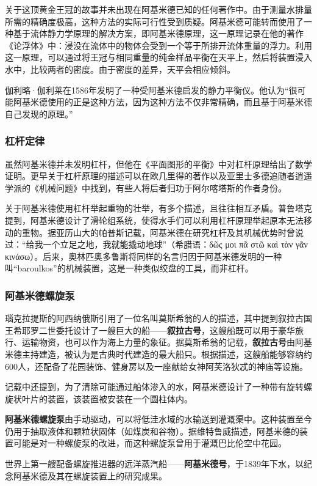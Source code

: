 关于这顶黄金王冠的故事并未出现在阿基米德已知的任何著作中。由于测量水排量所需的精确度极高，这种方法的实际可行性受到质疑。阿基米德可能转而使用了一种基于流体静力学原理的解决方案，即阿基米德原理，这一原理记录在他的著作《论浮体》中：浸没在流体中的物体会受到一个等于所排开流体重量的浮力。利用这一原理，可以通过将王冠与相同重量的纯金样品平衡在天平上，然后将装置浸入水中，比较两者的密度。由于密度的差异，天平会相应倾斜。

伽利略·伽利莱在1586年发明了一种受阿基米德启发的静力平衡仪。他认为“很可能阿基米德使用的正是这种方法，因为这种方法不仅非常精确，而且基于阿基米德自己发现的原理。”
\subsubsection{杠杆定律}
虽然阿基米德并未发明杠杆，但他在《平面图形的平衡》中对杠杆原理给出了数学证明。更早关于杠杆原理的描述可以在欧几里得的著作以及亚里士多德追随者逍遥学派的《机械问题》中找到，有些人将后者归功于阿尔喀塔斯的作者身份。

关于阿基米德使用杠杆举起重物的壮举，有多个描述，且往往相互矛盾。普鲁塔克提到，阿基米德设计了滑轮组系统，使得水手们可以利用杠杆原理举起原本无法移动的重物。据亚历山大的帕普斯记载，阿基米德在研究杠杆及其机械优势时曾说过：“给我一个立足之地，我就能撬动地球”（希腊语：δῶς μοι πᾶ στῶ καὶ τὰν γᾶν κινάσω）。后来，奥林匹奥多鲁斯将同样的名言归因于阿基米德发明的一种叫“baroulkos”的机械装置，这是一种类似绞盘的工具，而非杠杆。
\subsubsection{阿基米德螺旋泵}
瑙克拉提斯的阿西纳俄斯引用了一位名叫莫斯希翁的人的描述，其中提到叙拉古国王希耶罗二世委托设计了一艘巨大的船——\textbf{叙拉古号}，这艘船既可以用于豪华旅行、运输物资，也可以作为海上力量的象征。据莫斯希翁的记载，\textbf{叙拉古号}由阿基米德主持建造，被认为是古典时代建造的最大船只。根据描述，这艘船能够容纳约600人，还配备了花园装饰、健身房以及一座献给女神阿芙洛狄忒的神庙等设施。  

记载中还提到，为了清除可能通过船体渗入的水，阿基米德设计了一种带有旋转螺旋状叶片的装置，该装置被安装在一个圆柱体内。  

\textbf{阿基米德螺旋泵}由手动驱动，可以将低洼水域的水输送到灌溉渠中。这种装置至今仍用于抽取液体和颗粒状固体（如煤炭和谷物）。据维特鲁威描述，阿基米德的装置可能是对一种螺旋泵的改进，而这种螺旋泵曾用于灌溉巴比伦空中花园。  

世界上第一艘配备螺旋推进器的远洋蒸汽船——\textbf{阿基米德号}，于1839年下水，以纪念阿基米德及其在螺旋装置上的研究成果。

